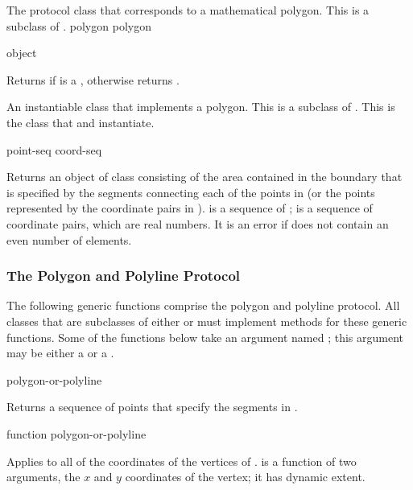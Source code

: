 
The protocol class that corresponds to a mathematical polygon.  This is a
subclass of .
 {polygon} {polygon}

 {object}

Returns  if  is a , otherwise returns
.


An instantiable class that implements a polygon.  This is a subclass of
.  This is the class that  and 
instantiate.
\Immutable

  {point-seq}
 {coord-seq}

Returns an object of class  consisting of the area
contained in the boundary that is specified by the segments connecting each of
the points in  (or the points represented by the coordinate pairs
in ).   is a sequence of ;
 is a sequence of coordinate pairs, which are real numbers.  It
is an error if  does not contain an even number of elements.

\MayCaptureInputs


\subsubsection {The Polygon and Polyline Protocol}

The following generic functions comprise the polygon and polyline protocol.  All
classes that are subclasses of either  or  must
implement methods for these generic functions.  Some of the functions below take
an argument named ; this argument may be either a
 or a .

 {polygon-or-polyline}

Returns a sequence of points that specify the segments in .
\ReadOnly

 {function polygon-or-polyline}

Applies  to all of the coordinates of the vertices of
.   is a function of two arguments, the
$x$ and $y$ coordinates of the vertex; it has dynamic extent.

